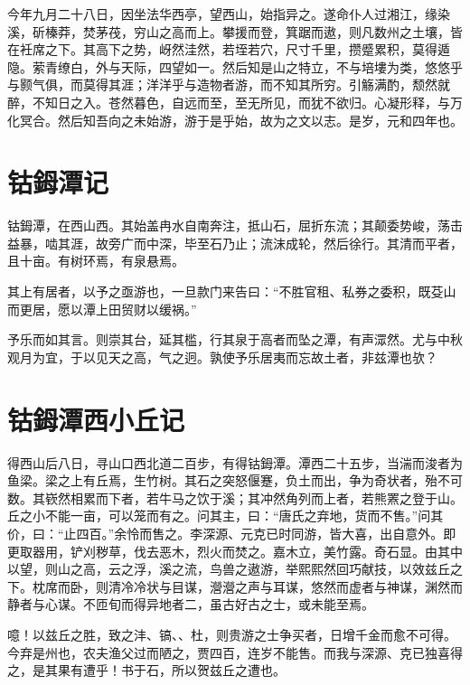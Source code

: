 \documentclass[UTF8,titlepage,oneside]{ctexbook}
\begin{document}
今年九月二十八日，因坐法华西亭，望西山，始指异之。遂命仆人过湘江，缘染溪，斫榛莽，焚茅茷，穷山之高而上。攀援而登，箕踞而遨，则凡数州之土壤，皆在衽席之下。其高下之势，岈然洼然，若垤若穴，尺寸千里，攒蹙累积，莫得遁隐。萦青缭白，外与天际，四望如一。然后知是山之特立，不与培塿为类，悠悠乎与颢气俱，而莫得其涯；洋洋乎与造物者游，而不知其所穷。引觞满酌，颓然就醉，不知日之入。苍然暮色，自远而至，至无所见，而犹不欲归。心凝形释，与万化冥合。然后知吾向之未始游，游于是乎始，故为之文以志。是岁，元和四年也。



\section*{钴鉧潭记}


钴鉧潭，在西山西。其始盖冉水自南奔注，抵山石，屈折东流；其颠委势峻，荡击益暴，啮其涯，故旁广而中深，毕至石乃止；流沫成轮，然后徐行。其清而平者，且十亩。有树环焉，有泉悬焉。

其上有居者，以予之亟游也，一旦款门来告曰：“不胜官租、私券之委积，既芟山而更居，愿以潭上田贸财以缓祸。”

予乐而如其言。则崇其台，延其槛，行其泉于高者而坠之潭，有声潀然。尤与中秋观月为宜，于以见天之高，气之迥。孰使予乐居夷而忘故土者，非兹潭也欤？



\section*{钴鉧潭西小丘记}


得西山后八日，寻山口西北道二百步，有得钴鉧潭。潭西二十五步，当湍而浚者为鱼梁。梁之上有丘焉，生竹树。其石之突怒偃蹇，负土而出，争为奇状者，殆不可数。其嵚然相累而下者，若牛马之饮于溪；其冲然角列而上者，若熊罴之登于山。丘之小不能一亩，可以笼而有之。问其主，曰：“唐氏之弃地，货而不售。”问其价，曰：“止四百。”余怜而售之。李深源、元克已时同游，皆大喜，出自意外。即更取器用，铲刈秽草，伐去恶木，烈火而焚之。嘉木立，美竹露。奇石显。由其中以望，则山之高，云之浮，溪之流，鸟兽之遨游，举熙熙然回巧献技，以效兹丘之下。枕席而卧，则清冷冷状与目谋，瀯瀯之声与耳谋，悠然而虚者与神谋，渊然而静者与心谋。不匝旬而得异地者二，虽古好古之士，或未能至焉。

噫！以兹丘之胜，致之沣、镐、、杜，则贵游之士争买者，日增千金而愈不可得。今弃是州也，农夫渔父过而陋之，贾四百，连岁不能售。而我与深源、克已独喜得之，是其果有遭乎！书于石，所以贺兹丘之遭也。
\end{document}
